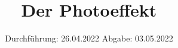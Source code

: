 

\subject{V 500}
\title{Der Photoeffekt}
\date{%
  Durchführung: 26.04.2022
  \hspace{3em}
  Abgabe: 03.05.2022
}



\maketitle
\thispagestyle{empty}
\tableofcontents
\newpage






\printbibliography{}


